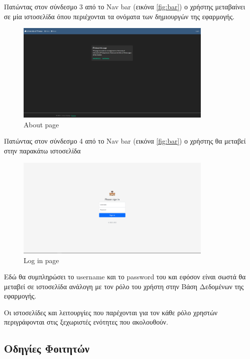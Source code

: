 \documentclass[12pt]{article}
\begin{document}
	Πατώντας στον σύνδεσμο 3 από το Nav bar (εικόνα \ref{fig:bar}) ο χρήστης μεταβαίνει σε μία ιστοσελίδα όπου περιέχονται τα ονόματα των δημιουργών της εφαρμογής.
	
	
	\begin{figure}[H]
		\centering
		\includegraphics[width=0.85\textwidth]{abouts.png}
		\caption{About page}
		\label{fig:emptyView}
	\end{figure}

	Πατώντας στον σύνδεσμο 4 από το Nav bar (εικόνα \ref{fig:bar}) ο χρήστης θα μεταβεί στην παρακάτω ιστοσελίδα
	
	\begin{figure}[H]
	\centering
	\includegraphics[width=0.85\textwidth]{logs.png}
	\caption{Log in page}
	\label{fig:emptyView}
	\end{figure}
	
	Εδώ θα συμπληρώσει το username και το password του και εφόσον είναι σωστά θα μεταβεί σε ιστοσελίδα ανάλογη με τον ρόλο του χρήστη στην Βάση Δεδομένων της εφαρμογής.
	
	Οι ιστοσελίδες και λειτουργίες που παρέχονται για τον κάθε ρόλο χρηστών περιγράφονται στις ξεχωριστές ενότητες που ακολουθούν.

	\newpage
	\subsection{Οδηγίες Φοιτητών}
	
\end{document}
